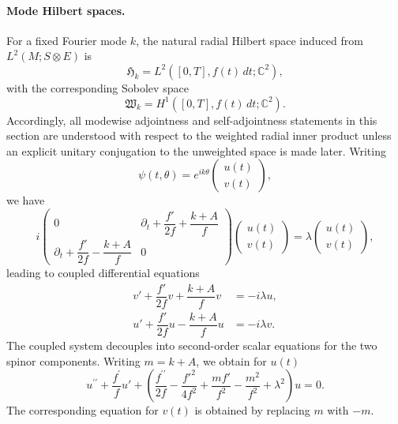 \documentclass[11pt]{article}
\newcommand{\C}{\mathbb{C}}
\theoremstyle{definition}
\numberwithin{equation}{section}
\begin{document}
\paragraph{Mode Hilbert spaces.}
For a fixed Fourier mode $k$, the natural radial Hilbert space induced from
$L^2(M;S\otimes E)$ is
\begin{equation}
\mathfrak H_k=L^2([0,T],f(t)\,dt;\C^2),
\end{equation}
with the corresponding Sobolev space
\begin{equation}
\mathfrak W_k=H^1([0,T],f(t)\,dt;\C^2).
\end{equation}
Accordingly, all modewise adjointness and self-adjointness statements in this section are understood with respect to the weighted radial inner product unless an explicit unitary conjugation to the unweighted space is made later. Writing
\begin{equation}\label{eq: ansatz}
\psi(t,\theta) = 
e^{ik \theta} \begin{pmatrix}
u(t) \\
v(t)
\end{pmatrix},
\end{equation}
we have
\begin{equation}
i \begin{pmatrix}
0 & \partial_t + \dfrac{f'}{2f} + \dfrac{k + A}{f} \\
\partial_t + \dfrac{f'}{2f} - \dfrac{k + A}{f} & 0
\end{pmatrix}
\begin{pmatrix}
u(t) \\
v(t)
\end{pmatrix}
= \lambda
\begin{pmatrix}
u(t) \\
v(t)
\end{pmatrix} ,
\end{equation}
leading to coupled differential equations
\begin{subequations}\label{eq:uv_system}
\begin{align}
v' + \dfrac{f'}{2f} v + \dfrac{k + A}{f} v &= -i\lambda u, \label{eq:uv_system_a}\\
u' + \dfrac{f'}{2f} u - \dfrac{k + A}{f} u &= -i\lambda v. \label{eq:uv_system_b}
\end{align}
\end{subequations}
The coupled system decouples into second-order scalar equations for the two spinor components. Writing \(m=k+A\), we obtain for \(u(t)\)
\begin{equation}
u^{\prime \prime} + \dfrac{f^\prime}{f} u' + \left( \frac{f^{\prime \prime}}{2 f} - \frac{f'^2}{4f^2} + \frac{m f'}{f^2} - \frac{m^2}{f^2} + \lambda^2 \right) u = 0.
\end{equation}
The corresponding equation for \(v(t)\) is obtained by replacing \(m\) with \(-m\).
\end{document}
